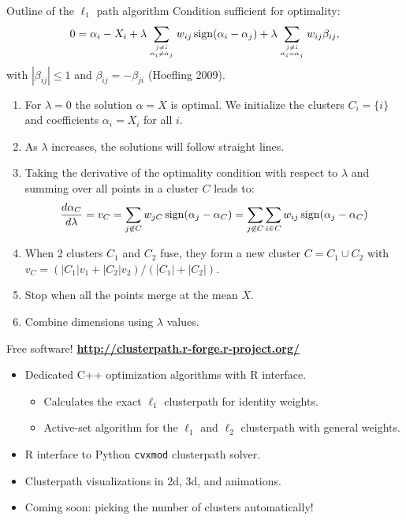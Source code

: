 \documentclass[final]{beamer}
\begin{document}
\begin{frame}{}
\begin{columns}[T]
\begin{column}{0.315\linewidth}
\begin{block}{Outline of the $\ell_1$ path algorithm}
Condition sufficient for optimality:
$$0 = \alpha_i - X_i + 
\lambda \sum_{j\neq i\atop \alpha_i \neq \alpha_j}w_{ij}
\operatorname{sign}({\alpha_i-\alpha_j}) + 
\lambda \sum_{j\neq i \atop \alpha_i = \alpha_j}w_{ij} \beta_{ij},$$
with $|\beta_{ij}|\leq 1$ and $\beta_{ij}=-\beta_{ji}$ (Hoefling 2009).
\begin{enumerate}
\item For $\lambda=0$ the solution $\alpha=X$ is optimal. We
  initialize the clusters $C_i = \{i\}$ and coefficients $\alpha_i =
  X_i$ for all $i$.
\item As $\lambda$ increases, the solutions will follow straight
  lines.
\item Taking the derivative of the optimality condition with respect
  to $\lambda$ and summing over all points in a cluster $C$ leads to:
$$\frac {d\alpha_C}{d\lambda}=v_C = \sum_{j\not\in C}w_{jC}\operatorname{sign}(\alpha_j-\alpha_C)=\sum_{j\not\in C}\sum_{i\in C} w_{ij}\operatorname{sign}(\alpha_j-\alpha_C)$$
\item When 2 clusters $C_1$ and $C_2$ fuse, they form a
  new cluster $C = C_1\cup C_2$ with $v_C = (
|C_1|v_1 + |C_2|v_2
)/(
|C_1|+|C_2|
)$.
\item Stop when all the points merge at the mean $\overline X$.
\item Combine dimensions using $\lambda$ values.
\end{enumerate}

\end{block}



\begin{alertblock}{Free software!
    \textbf{\url{http://clusterpath.r-forge.r-project.org/}}}
\begin{itemize}
\item Dedicated C++ optimization algorithms with R interface.
  \begin{itemize}
  \item Calculates the exact $\ell_1$ clusterpath for identity weights.
  \item Active-set algorithm for the $\ell_1$ and $\ell_2$
    clusterpath with general weights.
  \end{itemize}
\item R interface to Python \texttt{cvxmod} clusterpath solver.
\item Clusterpath visualizations in 2d, 3d, and animations.
\item Coming soon: picking the number of clusters automatically!
\end{itemize}
\end{alertblock}


\end{column}
\end{columns}
\end{frame}
\end{document}
